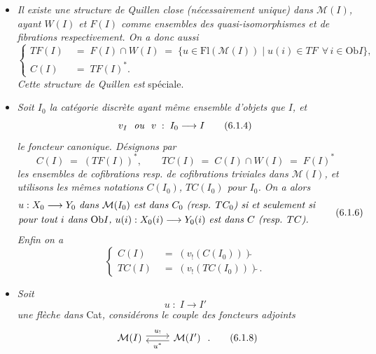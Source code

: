 \documentclass[11pt]{article}
\newcommand{\printedpage}[1]{\marginpar{\footnotesize p.~#1}}
\newcommand{\msp}[1]{\marginpar{\footnotesize [#1]}}
\newcommand{\tl}{\tilde{}}
\newcommand{\Ob}{\mathrm{Ob}}
\newcommand{\Fl}{\mathrm{Fl}}
\begin{document}
\begin{itemize}[leftmargin=2.5em]
\item[a)] \textit{Il existe une structure de Quillen close (nécessairement unique) dans $\mathcal{M}(I)$, ayant $W(I)$ et $F(I)$ comme ensembles des quasi-isomorphismes et de fibrations respectivement. On a donc aussi}
\[
\left\{
\begin{aligned}
TF(I) \;&=\; F(I)\cap W(I) \;=\; \{u\in \Fl(\mathcal{M}(I)) \mid u(i)\in TF \ \ \forall\, i\in \Ob I\},\\
C(I) \;&=\; TF(I)^{*}.
\end{aligned}
\right.
\tag*{(6.1.3)}
\]
\textit{Cette structure de Quillen est} spéciale.

\msp{page 99}
\item[b)] \textit{Soit $I_0$ la catégorie discrète ayant même ensemble d'objets que $I$, et}
\[
v_I \ \ \text{\textit{ou}}\ \ v \;:\; I_0 \longrightarrow I
\tag*{(6.1.4)}
\]
\textit{le foncteur canonique. Désignons par}
\[
C(I) \;=\; (TF(I))^{*}, \qquad TC(I) \;=\; C(I)\cap W(I) \;=\; F(I)^{*}
\tag*{(6.1.5)}
\]
\textit{les ensembles de cofibrations resp. de cofibrations triviales dans $\mathcal{M}(I)$, et utilisons les mêmes notations $C(I_0)$, $TC(I_0)$ pour $I_0$. On a alors}
\[
\begin{aligned}
&\text{\textit{$u : X_0 \longrightarrow Y_0$ dans $\mathcal{M}(I_0)$ est dans $C_0$ (resp. $TC_0$) si et seulement si}}\\
&\text{\textit{pour tout $i$ dans $\Ob I$, $u(i) : X_0(i) \longrightarrow Y_0(i)$ est dans $C$ (resp. $TC$).}}
\end{aligned}
\tag*{(6.1.6)}
\]
\textit{Enfin on a}
\[
\left\{
\begin{aligned}
C(I) \;&=\; (v_!(C(I_0)))\tl\\
TC(I) \;&=\; (v_!(TC(I_0)))\tl\,.
\end{aligned}
\right.
\tag*{(6.1.7)} %
\]

\item[c)] \textit{Soit}
\[
u \;:\; I \longrightarrow I'
\]
\textit{une flèche dans} Cat\textit{, considérons le couple des foncteurs adjoints}
\[
\begin{tikzcd}
\mathcal{M}(I) \arrow[r, shift left, "u_!"] & \mathcal{M}(I') \arrow[l, shift left, "u^{*}"]
\end{tikzcd}
\;.
\tag*{(6.1.8)}
\]

\printedpage{50}


\end{itemize}
\end{document}
